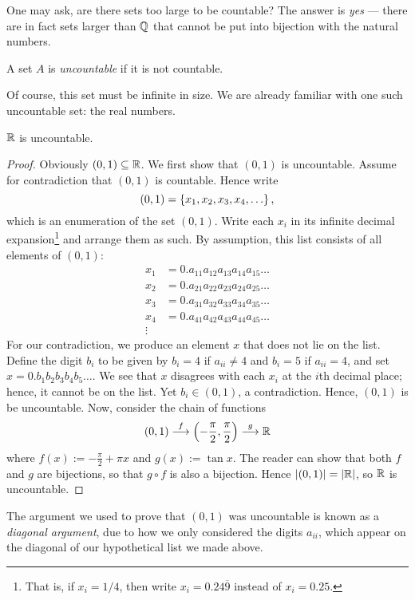 \documentclass{article}
\begin{document}
One may ask, are there sets too large to be countable? The answer is \textit{yes} --- there are in fact sets larger than $\mathbb Q$ that cannot be put into bijection with the natural numbers.
\begin{definition}
A set $A$ is \textit{uncountable} if it is not countable.
\end{definition}
Of course, this set must be infinite in size. We are already familiar with one such uncountable set: the real numbers.
\begin{theorem}
$\mathbb R$ is uncountable.
\end{theorem}
\begin{proof}
Obviously $(0, 1)\subseteq \mathbb R$. We first show that $(0, 1)$ is uncountable. Assume for contradiction that $(0, 1)$ is countable. Hence write
$$(0, 1) = \left\{x_1, x_2, x_3, x_4,\ldots\right\},$$
which is an enumeration of the set $(0, 1)$. Write each $x_i$ in its infinite decimal expansion\footnote{That is, if $x_i = 1/4$, then write $x_i = 0.24\overline 9$ instead of $x_i=0.25$.} and arrange them as such. By assumption, this list consists of all elements of $(0, 1)$:
\begin{align*}
x_1 &= 0.a_{11}a_{12}a_{13}a_{14}a_{15}\ldots \\
x_2 &= 0.a_{21}a_{22}a_{23}a_{24}a_{25}\ldots \\
x_3 &= 0.a_{31}a_{32}a_{33}a_{34}a_{35}\ldots \\
x_4 &= 0.a_{41}a_{42}a_{43}a_{44}a_{45}\ldots \\
\vdots
\end{align*}
For our contradiction, we produce an element $x$ that does not lie on the list. Define the digit $b_i$ to be given by $b_i = 4$ if $a_{ii}\neq 4$ and $b_i = 5$ if $a_{ii} = 4$, and set $x = 0.b_1b_2b_3b_4b_5\ldots$. We see that $x$ disagrees with each $x_i$ at the $i$th decimal place; hence, it cannot be on the list. Yet $b_i \in (0, 1)$, a contradiction. Hence, $(0, 1)$ is be uncountable. Now, consider the chain of functions
$$(0, 1) \overset f\longrightarrow \left(-\frac \pi2, \frac\pi2 \right) \overset g\longrightarrow \mathbb R$$
where $f(x) := -\frac \pi2 + \pi x$ and $g(x) := \tan x$. The reader can show that both $f$ and $g$ are bijections, so that $g\circ f$ is also a bijection. Hence $\left|(0, 1)\right| = |\mathbb R|$, so $\mathbb R$ is uncountable.
\end{proof}

\newpage
The argument we used to prove that $(0, 1)$ was uncountable is known as a \textit{diagonal argument}, due to how we only considered the digits $a_{ii}$, which appear on the diagonal of our hypothetical list we made above.
\end{document}
